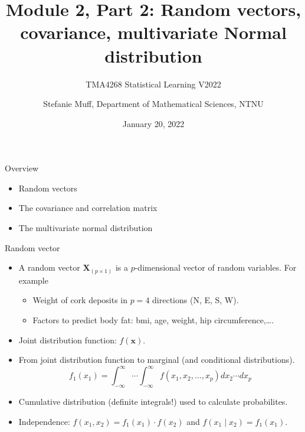 \documentclass[ignorenonframetext,]{beamer}
\title{Module 2, Part 2: Random vectors, covariance, multivariate Normal
distribution}
\subtitle{TMA4268 Statistical Learning V2022}
\author{Stefanie Muff, Department of Mathematical Sciences, NTNU}
\date{January 20, 2022}
\providecommand{\tightlist}{%
  \setlength{\itemsep}{0pt}\setlength{\parskip}{0pt}}
\begin{document}
\frame{\titlepage}

\begin{frame}{Overview}
\protect\hypertarget{overview}{}

\normalsize

\begin{itemize}
\item
  Random vectors \vspace{2mm}
\item
  The covariance and correlation matrix \vspace{2mm}
\item
  The multivariate normal distribution
\end{itemize}

\end{frame}

\begin{frame}{Random vector}
\protect\hypertarget{random-vector}{}

\begin{itemize}
\tightlist
\item
  A random vector \(\boldsymbol{X}_{(p\times 1)}\) is a
  \(p\)-dimensional vector of random variables. For example

  \begin{itemize}
  \tightlist
  \item
    Weight of cork deposits in \(p=4\) directions (N, E, S, W).
  \item
    Factors to predict body fat: bmi, age, weight, hip
    circumference,\ldots{}.
  \end{itemize}
\item
  Joint distribution function: \(f(\boldsymbol{x})\).
\item
  From joint distribution function to marginal (and conditional
  distributions).
  \[f_1(x_1)=\int_{-\infty}^{\infty}\cdots \int_{-\infty}^{\infty} f(x_1,x_2,\ldots,x_p)dx_2 \cdots dx_p\]
\item
  Cumulative distribution (definite integrals!) used to calculate
  probabilites.
\item
  Independence: \(f(x_1,x_2)=f_1(x_1)\cdot f(x_2)\) and
  \(f(x_1\mid x_2)=f_1(x_1).\)
\end{itemize}

\end{frame}
\end{document}

